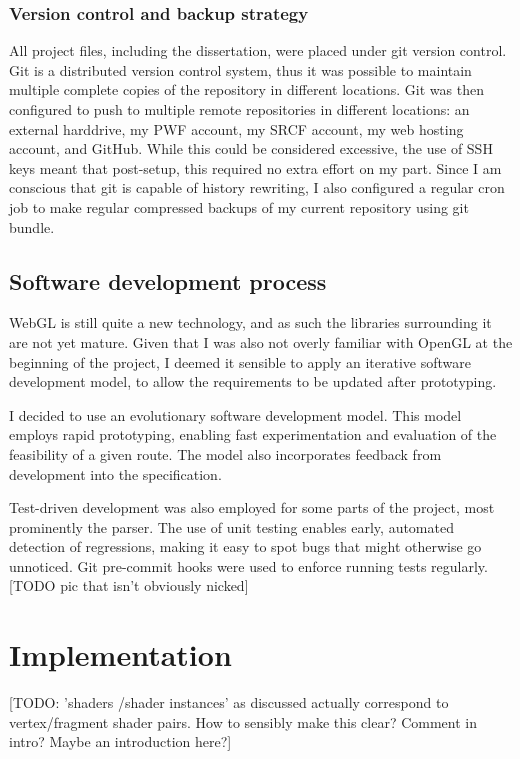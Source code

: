 \documentclass[12pt,twoside,notitlepage]{report}
\begin{document}
\subsection{Version control and backup strategy}
All project files, including the dissertation, were placed under git version control. Git is a distributed version control system, thus it was possible to maintain multiple complete copies of the repository in different locations. Git was then configured to push to multiple remote repositories in different locations: an external harddrive, my PWF account, my SRCF account, my web hosting account, and GitHub. While this could be considered excessive, the use of SSH keys meant that post-setup, this required no extra effort on my part. Since I am conscious that git is capable of history rewriting, I also configured a regular cron job to make regular compressed backups of my current repository using git bundle.

\section{Software development process}
WebGL is still quite a new technology, and as such the libraries surrounding it are not yet mature. Given that I was also not overly familiar with OpenGL at the beginning of the project, I deemed it sensible to apply an iterative software development model, to allow the requirements to be updated after prototyping. 

I decided to use an evolutionary software development model. This model employs rapid prototyping, enabling fast experimentation and evaluation of the feasibility of a given route. The model also incorporates feedback from development into the specification.

Test-driven development was also employed for some parts of the project, most prominently the parser. The use of unit testing enables early, automated detection of regressions, making it easy to spot bugs that might otherwise go unnoticed. Git pre-commit hooks were used to enforce running tests regularly. [TODO pic that isn't obviously nicked]


\cleardoublepage
\chapter{Implementation}
[TODO: 'shaders /shader instances' as discussed actually correspond to vertex/fragment shader pairs. How to sensibly make this clear? Comment in intro? Maybe an introduction here?]
\end{document}
